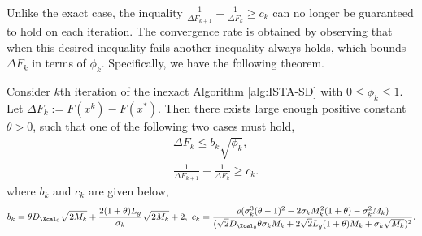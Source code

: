 \documentclass[11pt]{article}
\numberwithin{equation}{section}
\begin{document}
Unlike the exact case, the inquality 
$\frac{1}{\Delta F_{k+1}}-\frac{1}{\Delta F_{k}}\geq c_k$ can no longer be guaranteed to hold on each iteration. 
The convergence rate is obtained by observing that when this desired inequality fails another inequality always holds, which bounds 
$\Delta F_{k}$ in terms of $\phi_k$. Specifically, we have the following theorem.
\begin{lemma}
\label{lem:bound_iter_inexact}
	Consider $k$th iteration of the inexact Algorithm \ref{alg:ISTA-SD} with $0 \leq \phi_k\leq 1$. Let $\Delta F_k := F(x^k) - F(x^*)$. Then there exists large enough positive constant $\theta > 0$, such that one of the following two cases must hold,
	\begin{align}
		\label{equ:bound_F_inexact_case1}
	    &\Delta F_k \leq b_k\sqrt{\phi_k}, \\
	    \label{equ:bound_F_inexact_case2}
	    &\frac{1}{\Delta F_{k+1}}-\frac{1}{\Delta F_{k}}\geq c_k.
	\end{align}
	where $b_k$ and $c_k$ are given below,
	\begin{align}
	\label{equ:bound_bk_ck}
	    b_k = \theta D_{\Xcal_0}\sqrt{2M_k}+  \frac{2(1+\theta)L_g}{\sigma_k}\sqrt{2M_k} + 2, 
	    ~
	    c_k=\frac{\rho(\sigma_k^3(\theta-1)^2 - 2\sigma_kM_k^2(1+\theta) - \sigma_k^2M_k )}{(\sqrt{2}D_{\Xcal_0}\theta\sigma_kM_k + 2\sqrt{2}L_g(1+\theta)M_k + \sigma_k\sqrt{M_k} )^2}.
	\end{align}
\end{lemma}
\end{document}
